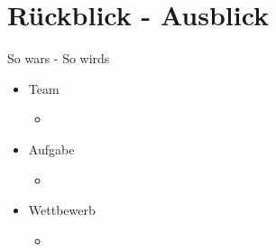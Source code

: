 \section{Rückblick - Ausblick} %
\begin{frame}
	\begin{block}{So wars - So wirds}
		\begin{itemize}
			\item Team
			\begin{itemize}
                \item
			\end{itemize}
			\item Aufgabe
			\begin{itemize}
                \item
			\end{itemize}
			\item Wettbewerb
			\begin{itemize}
                \item
			\end{itemize}
		\end{itemize}
	\end{block}
\end{frame}
